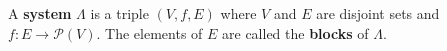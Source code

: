 A \textbf{system} $\Lambda$ is a triple $(V, f, E)$ where $V$ and $E$ are disjoint sets and $f: E \to \mathcal{P}(V)$. The elements of $E$ are called the \textbf{blocks} of $\Lambda$.
